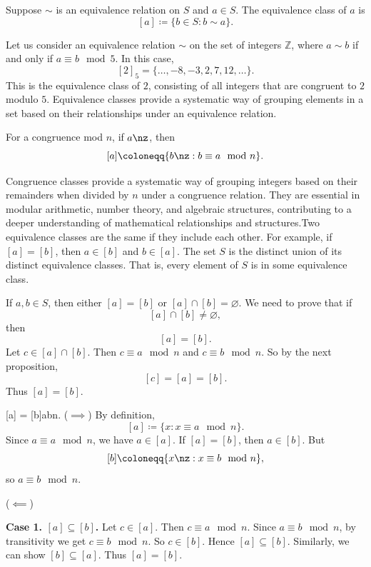 \begin{definition}
    Suppose $\sim$ is an equivalence relation on $S$ and $a\in S$.
    The equivalence class of $a$ is
    \[
        [a] \coloneqq \{b\in S : b\sim a\}.
    \]
\end{definition}

Let us consider an equivalence relation $\sim$ on the set of integers $\mathbb{Z}$, where $a\sim b$ if and only if $a\equiv b\mod 5$.
In this case,
\[
    [2]_5=\{\hdots,-8,-3,2,7,12,\hdots\}.
\]
This is the equivalence class of $2$, consisting of all integers that are congruent to $2$ modulo $5$.
Equivalence classes provide a systematic way of grouping elements in a set based on their relationships under an equivalence relation.

\begin{definition}
    For a congruence mod $n$, if $a\nz$, then
    \[
        [a]\coloneqq \{b\nz : b\equiv a\mod n\}.
    \]
\end{definition}

Congruence classes provide a systematic way of grouping integers based on their remainders when divided by $n$ under a congruence relation.
They are essential in modular arithmetic, number theory, and algebraic structures, contributing to a deeper understanding of mathematical relationships and structures.Two equivalence classes are the same if they include each other.
For example, if $[a] = [b]$, then $a\in [b]$ and $b\in[a]$.
The set $S$ is the distinct union of its distinct equivalence classes.
That is, every element of $S$ is in some equivalence class.

\begin{proposition}{
    If $a,b\in S$, then either $[a] = [b]$ or $[a]\cap[b] = \varnothing$.
}
    We need to prove that if
    \[
        [a]\cap[b]\neq \varnothing,
    \]
    then
    \[
        [a]=[b].
    \]
    Let $c\in[a]\cap[b]$.
    Then $c\equiv a\mod n$ and $c\equiv b\mod n$.
    So by the next proposition,
    \[
        [c] = [a] = [b].
    \]
    Thus $[a] = [b]$.
\end{proposition}

\begin{proposition}{
    [a] = [b]\iff a\equiv b\mod n.
}
    ($\implies$)
By definition,
\[
    [a]\coloneqq\{x : x\equiv a\mod n\}.
\]
Since $a\equiv a\mod n$, we have $a\in[a]$.
If $[a]=[b]$, then $a\in[b]$.
But
\[
    [b]\coloneqq\{x\nz : x\equiv b\mod n\},
\]
so $a\equiv b\mod n$.

($\impliedby$)

\textbf{Case 1. $[a]\subseteq[b]$.}
Let $c\in[a]$.
Then $c\equiv a\mod n$.
Since $a\equiv b\mod n$, by transitivity we get $c\equiv b\mod n$.
So $c\in[b]$.
Hence $[a]\subseteq[b]$.
Similarly, we can show $[b]\subseteq[a]$.
Thus $[a] = [b]$.
\end{proposition}


